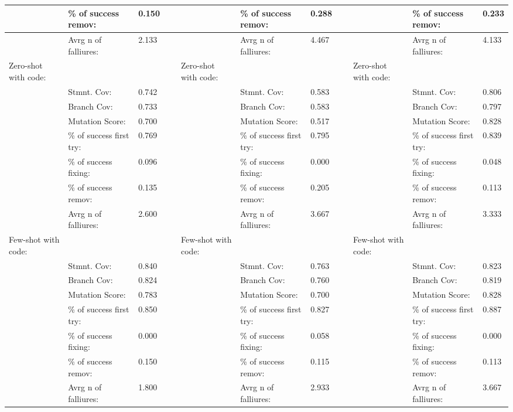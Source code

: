 \documentclass[a4paper,11pt,oneside]{memoir}
\begin{document}
\begin{table}[!ht]
{\begin{tabular}{|l|l|l|l|l|l|l|l|l|l|l|}
        ~ & \% of success remov: & 0.150 & ~ & ~ & \% of success remov: & 0.288 & ~ & ~ & \% of success remov: & 0.233 \\ \hline
        ~ & Avrg n of falliures: & 2.133 & ~ & ~ & Avrg n of falliures: & 4.467 & ~ & ~ & Avrg n of falliures: & 4.133 \\ \hline
        Zero-shot with code: & ~ & ~ & ~ & Zero-shot with code: & ~ & ~ & ~ & Zero-shot with code: & ~ & ~ \\ \hline
        ~ & Stmnt. Cov: & 0.742 & ~ & ~ & Stmnt. Cov: & 0.583 & ~ & ~ & Stmnt. Cov: & 0.806 \\ \hline
        ~ & Branch Cov: & 0.733 & ~ & ~ & Branch Cov: & 0.583 & ~ & ~ & Branch Cov: & 0.797 \\ \hline
        ~ & Mutation Score: & 0.700 & ~ & ~ & Mutation Score: & 0.517 & ~ & ~ & Mutation Score: & 0.828 \\ \hline
        ~ & \% of success first try: & 0.769 & ~ & ~ & \% of success first try: & 0.795 & ~ & ~ & \% of success first try: & 0.839 \\ \hline
        ~ & \% of success fixing: & 0.096 & ~ & ~ & \% of success fixing: & 0.000 & ~ & ~ & \% of success fixing: & 0.048 \\ \hline
        ~ & \% of success remov: & 0.135 & ~ & ~ & \% of success remov: & 0.205 & ~ & ~ & \% of success remov: & 0.113 \\ \hline
        ~ & Avrg n of falliures: & 2.600 & ~ & ~ & Avrg n of falliures: & 3.667 & ~ & ~ & Avrg n of falliures: & 3.333 \\ \hline
        Few-shot with code: & ~ & ~ & ~ & Few-shot with code: & ~ & ~ & ~ & Few-shot with code: & ~ & ~ \\ \hline
        ~ & Stmnt. Cov: & 0.840 & ~ & ~ & Stmnt. Cov: & 0.763 & ~ & ~ & Stmnt. Cov: & 0.823 \\ \hline
        ~ & Branch Cov: & 0.824 & ~ & ~ & Branch Cov: & 0.760 & ~ & ~ & Branch Cov: & 0.819 \\ \hline
        ~ & Mutation Score: & 0.783 & ~ & ~ & Mutation Score: & 0.700 & ~ & ~ & Mutation Score: & 0.828 \\ \hline
        ~ & \% of success first try: & 0.850 & ~ & ~ & \% of success first try: & 0.827 & ~ & ~ & \% of success first try: & 0.887 \\ \hline
        ~ & \% of success fixing: & 0.000 & ~ & ~ & \% of success fixing: & 0.058 & ~ & ~ & \% of success fixing: & 0.000 \\ \hline
        ~ & \% of success remov: & 0.150 & ~ & ~ & \% of success remov: & 0.115 & ~ & ~ & \% of success remov: & 0.113 \\ \hline
        ~ & Avrg n of falliures: & 1.800 & ~ & ~ & Avrg n of falliures: & 2.933 & ~ & ~ & Avrg n of falliures: & 3.667 \\ \hline
    \end{tabular}}
\end{table}
\newpage
\end{document}
